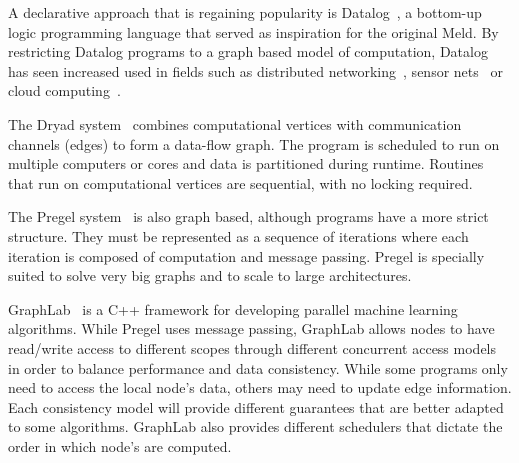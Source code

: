 
\begin{comment}
Many programming models have been developed in order to make parallel programs both easier to write and reason about. 
Declarative programming paradigms move away from the pitfalls of imperative programming and transfer the problem of parallelizing
the program to the compiler and runtime system. Famous examples of such paradigms are \emph{logic programming} and \emph{functional programming}.
In logic languages such as Prolog, researchers took advantage of the non-determinism of proof-search to evaluate subgoals
in parallel with models such as \emph{or-parallelism}~\cite{ali-86} and \emph{and-parallelism}~\cite{Shen-92}.


Recently, there has been an increasing interest in declarative and data-centric languages.
MapReduce~\cite{Dean:2008:MSD:1327452.1327492}, for instance, is a popular data-centric programming
model that is optimized for large clusters. The scheduling and data sharing model is very simple:
in the \emph{map phase}, data is transformed at each node and the result reduced to a final
result in the \emph{reduce phase}.
\end{comment}

A declarative approach that is regaining popularity is Datalog~\cite{Ullman:1990:PDK:533142}, a
bottom-up logic programming language that served as inspiration for the original Meld.
By restricting Datalog programs to a graph based model of computation, Datalog has seen increased
used in fields such as distributed networking~\cite{Loo-condie-garofalakis-p2}, sensor
nets~\cite{Chu:2007:DID:1322263.1322281} or cloud computing~\cite{alvaro:boom}.

The Dryad system~\cite{Isard:2007:DDD:1272996.1273005} combines computational vertices
with communication channels (edges) to form a data-flow graph. The program is scheduled to
run on multiple computers or cores and data is partitioned during runtime. Routines that run on computational vertices
are sequential, with no locking required.

The Pregel system~\cite{Malewicz:2010:PSL:1807167.1807184} is also graph based, although programs have a more strict
structure. They must be represented as a sequence of iterations where each iteration is composed of computation and message passing.
Pregel is specially suited to solve very big graphs
and to scale to large architectures.

GraphLab~\cite{GraphLab2010} is a C++ framework for developing parallel machine learning algorithms. While
Pregel uses message passing, GraphLab allows nodes to have read/write access to different scopes through different concurrent access models in order to balance performance and data consistency. While some programs only need to access the local node's data, others may need to update edge information. Each consistency model will provide different guarantees that are better adapted to some algorithms. GraphLab also provides different schedulers that dictate the order in which node's are computed.
